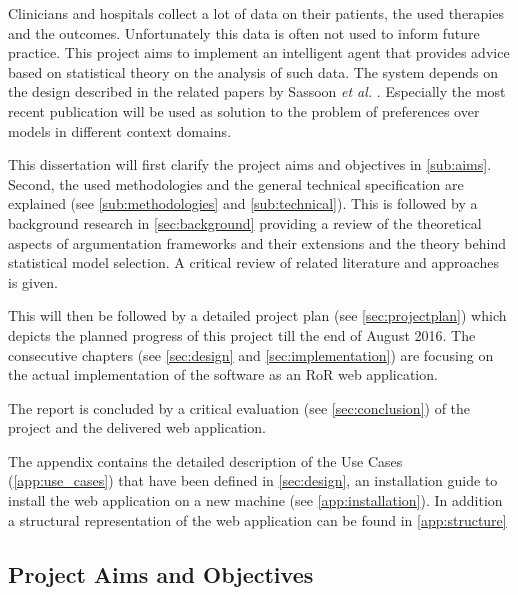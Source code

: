 Clinicians and hospitals collect a lot of data on their patients, the used therapies and the outcomes. Unfortunately this data is often not used to inform future practice. This project aims to implement an intelligent agent that provides advice based on statistical theory on the analysis of such data. The system depends on the design described in the related papers by Sassoon \textit{et al.} \cite{sassoon2014,sassoon2016,sassoon2016CD}. Especially the most recent publication will be used as solution to the problem of preferences over models in different context domains. 



This dissertation will first clarify the project aims and objectives in \autoref{sub:aims}. Second, the used methodologies and the general technical specification are explained (see \autoref{sub:methodologies} and \autoref{sub:technical}). This is followed by a background research in \autoref{sec:background} providing a review of the theoretical aspects of argumentation frameworks and their extensions and the theory behind statistical model selection. A critical review of related literature and approaches is given. 

This will then be followed by a detailed project plan (see \autoref{sec:projectplan}) which depicts the planned progress of this project till the end of August 2016. The consecutive chapters (see \autoref{sec:design} and \autoref{sec:implementation}) are focusing on the actual implementation of the software as an \gls{RoR} web application. 

The report is concluded by a critical evaluation (see \autoref{sec:conclusion}) of the project and the delivered web application.

The appendix contains the detailed description of the Use Cases (\autoref{app:use_cases}) that have been defined in \autoref{sec:design}, an installation guide to install the web application on a new machine (see \autoref{app:installation}). In addition a structural representation of the web application can be found in \autoref{app:structure}

\subsection{Project Aims and Objectives} 
\label{sub:aims}

